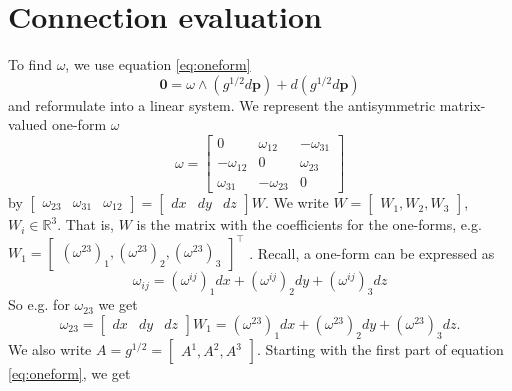 \documentclass[../thesis.tex]{subfiles}
\begin{document}
\section{Connection evaluation}\label{sec:evaluation}
To find $\omega$, we use equation \ref{eq:oneform}
$$\bm{0} = \omega \wedge (g^{1/2}d\bm{p})+ d(g^{1/2}d\bm{p})$$
and reformulate into a linear system.
We represent the antisymmetric matrix-valued one-form $\omega$
$$\omega = \begin{bmatrix}
 0 & \omega_{12} & -\omega_{31} \\
 -\omega_{12} & 0 & \omega_{23} \\
 \omega_{31} & -\omega_{23} & 0
\end{bmatrix}$$
by $
\begin{bmatrix}
  \omega_{23} & \omega_{31} & \omega_{12}
\end{bmatrix} = 
\begin{bmatrix}
  dx & dy & dz
\end{bmatrix} W$. We write $W=\begin{bmatrix}
  W_1,W_2,W_3
\end{bmatrix}$, $W_i \in \mathbb{R}^3$. That is, $W$ is the matrix with the coefficients for the one-forms, e.g.
$W_1 = \begin{bmatrix}
  (\omega^{23})_1, (\omega^{23})_2, (\omega^{23})_3
\end{bmatrix}^{\top}$
.
Recall, a one-form can be expressed as
$$
\omega_{ij}= (\omega^{ij})_1dx + (\omega^{ij})_2dy + (\omega^{ij})_3dz
$$
So e.g. for $\omega_{23}$ we get $$\omega_{23} = \begin{bmatrix}
  dx & dy & dz
\end{bmatrix}W_1 = (\omega^{23})_1dx + (\omega^{23})_2dy + (\omega^{23})_3dz.$$
We also write $A = g^{1/2}= \begin{bmatrix}
  A^1, A^2, A^3
\end{bmatrix}$.
Starting with the first part of equation \ref{eq:oneform}, we get
\end{document}
